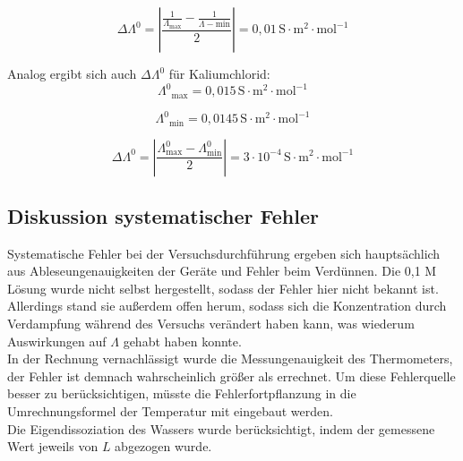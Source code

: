 \documentclass[12pt,a4paper,titlepage,headinclude,bibtotoc]{scrartcl}
\begin{document}
\begin{equation}
\Delta \mathit{\Lambda^0} = \left|\frac{\frac{1}{\mathit{\Lambda_\mathrm{max}}} - \frac{1}{\mathit{\Lambda-\mathrm{min}}}}{2} \right| = 0,01\, \mathrm{S \cdot m^2 \cdot mol^{-1}}
\end{equation}




Analog ergibt sich auch $\Delta \mathit{\Lambda^0}$ für Kaliumchlorid:\\

\begin{equation}
\mathit{\Lambda^0}_\mathrm{max} = 0,015\, \mathrm{S \cdot m^{2} \cdot mol^{-1}} 
\end{equation}

\begin{equation}
\mathit{\Lambda^0}_\mathrm{min} = 0,0145\, \mathrm{S \cdot m^{2} \cdot mol^{-1}} 
\end{equation}

\begin{equation}
\Delta \mathit{\Lambda^0} = \left|\mathit{\frac{\Lambda^0_\mathrm{max} - \Lambda^0_\mathrm{min}}{2}}\right| = 3 \cdot 10^{-4}\, \mathrm{S \cdot m^{2} \cdot mol^{-1}} 
\end{equation}





\subsection{Diskussion systematischer Fehler}

Systematische Fehler bei der Versuchsdurchführung ergeben sich hauptsächlich aus Ableseungenauigkeiten der Geräte und Fehler beim Verdünnen. Die 0,1 M Lösung wurde nicht selbst hergestellt, sodass der Fehler hier nicht bekannt ist. Allerdings stand sie außerdem offen herum, sodass sich die Konzentration durch Verdampfung während des Versuchs verändert haben kann, was wiederum Auswirkungen auf $\mathit{\Lambda}$ gehabt haben konnte.\\

In der Rechnung vernachlässigt wurde die Messungenauigkeit des Thermometers, der Fehler ist demnach wahrscheinlich größer als errechnet. Um diese Fehlerquelle besser zu berücksichtigen, müsste die Fehlerfortpflanzung in die Umrechnungsformel der Temperatur mit eingebaut werden.\\

Die Eigendissoziation des Wassers wurde berücksichtigt, indem der gemessene Wert jeweils von $L$ abgezogen wurde.\\
\end{document}
